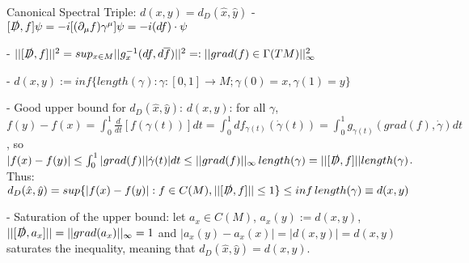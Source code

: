 \begin{frame}{Canonical Spectral Triple: $d(x, y) = d_D(\hat x, \hat y)$}
    - $[\slashed D, f]\psi = -i [(\partial_\mu f) \gamma^\mu] \psi = -i(df)\cdot \psi$
    
    - $||[\slashed D, f]||^2 = sup_{x \in M} ||g_x^{-1}(df, d \overline{f})||^2 =: ||grad(f) \in \Gamma(TM)||_\infty^2$

    - $d(x, y) := inf\{length(\gamma): \gamma:[0,1] \to M; \gamma(0) = x, \gamma(1) = y\}$
    
    - Good upper bound for $d_D(\hat x, \hat y)$: $d(x, y)$: for all $\gamma$, $f(y) - f(x) = \int_0^1 \frac{d}{dt}[f(\gamma(t))]dt = \int_0^1 df_{\gamma(t)} (\dot \gamma(t)) = \int_0^1 g_{\gamma(t)}(grad(f), \dot \gamma) dt$, 
    so
    $|f(x) - f(y)| \leq \int_0^1 |grad(f)| |\dot \gamma(t)| dt \leq ||grad(f)||_
    \infty \, length(\gamma) = ||[\slashed D, f]|| length(\gamma)$. 
    Thus:
    $d_D(\hat x, \hat y) = sup\{|f(x) - f(y)|: f \in C(M), ||[\slashed D, f]||\leq 1\} \leq inf \, length(\gamma) \equiv d(x, y)$
    
    - Saturation of the upper bound: let $a_x \in C(M)$, $a_x(y) := d(x, y)$, %
    $||[\slashed D, a_x]|| = ||grad(a_x)||_\infty = 1$ and $|a_x(y) - a_x(x)| = |d(x,y)| = d(x,y)$ saturates the inequality, meaning that $ d_D(\hat x, \hat y) = d(x, y)$.
    
    
    
\end{frame}


